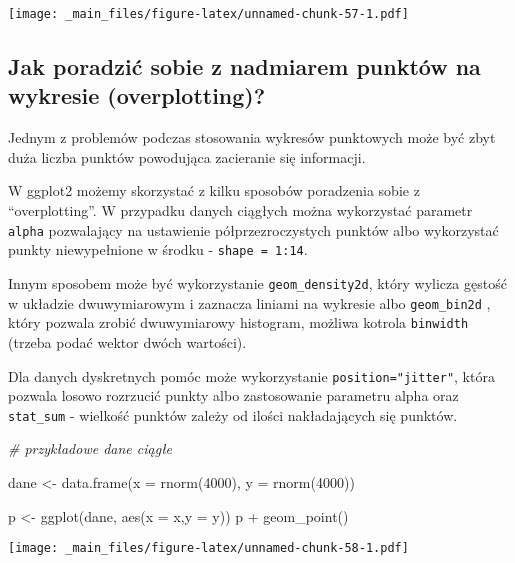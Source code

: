 \documentclass[
]{book}
\newenvironment{Shaded}{\begin{snugshade}}{\end{snugshade}}
\newcommand{\AttributeTok}[1]{\textcolor[rgb]{0.77,0.63,0.00}{#1}}
\newcommand{\CommentTok}[1]{\textcolor[rgb]{0.56,0.35,0.01}{\textit{#1}}}
\newcommand{\DecValTok}[1]{\textcolor[rgb]{0.00,0.00,0.81}{#1}}
\newcommand{\FunctionTok}[1]{\textcolor[rgb]{0.00,0.00,0.00}{#1}}
\newcommand{\NormalTok}[1]{#1}
\newcommand{\OtherTok}[1]{\textcolor[rgb]{0.56,0.35,0.01}{#1}}
\newcommand{\SpecialCharTok}[1]{\textcolor[rgb]{0.00,0.00,0.00}{#1}}
\begin{document}
\texttt{[image: \_main\_files/figure-latex/unnamed-chunk-57-1.pdf]}

\hypertarget{jak-poradziux107-sobie-z-nadmiarem-punktuxf3w-na-wykresie-overplotting}{%
\subsection{Jak poradzić sobie z nadmiarem punktów na wykresie (overplotting)?}\label{jak-poradziux107-sobie-z-nadmiarem-punktuxf3w-na-wykresie-overplotting}}

Jednym z problemów podczas stosowania wykresów punktowych może być zbyt duża liczba punktów powodująca zacieranie się informacji.

W ggplot2 możemy skorzystać z kilku sposobów poradzenia sobie z ``overplotting''. W przypadku danych ciągłych można wykorzystać parametr \texttt{alpha} pozwalający na ustawienie półprzezroczystych punktów albo wykorzystać punkty niewypełnione w środku - \texttt{shape\ =\ 1:14}.

Innym sposobem może być wykorzystanie \texttt{geom\_density2d}, który wylicza gęstość w układzie dwuwymiarowym i zaznacza liniami na wykresie albo \texttt{geom\_bin2d} , który pozwala zrobić dwuwymiarowy histogram, możliwa kotrola \texttt{binwidth} (trzeba podać wektor dwóch wartości).

Dla danych dyskretnych pomóc może wykorzystanie \texttt{position="jitter"}, która pozwala losowo rozrzucić punkty albo zastosowanie parametru alpha oraz \texttt{stat\_sum} - wielkość punktów zależy od ilości nakładających się punktów.

\begin{Shaded}
\begin{Highlighting}[]
\CommentTok{\# przykładowe dane ciągłe}

\NormalTok{dane }\OtherTok{\textless{}{-}} \FunctionTok{data.frame}\NormalTok{(}\AttributeTok{x =} \FunctionTok{rnorm}\NormalTok{(}\DecValTok{4000}\NormalTok{), }\AttributeTok{y =} \FunctionTok{rnorm}\NormalTok{(}\DecValTok{4000}\NormalTok{))}

\NormalTok{p }\OtherTok{\textless{}{-}} \FunctionTok{ggplot}\NormalTok{(dane, }\FunctionTok{aes}\NormalTok{(}\AttributeTok{x =}\NormalTok{ x,}\AttributeTok{y =}\NormalTok{ y))}
\NormalTok{p }\SpecialCharTok{+} \FunctionTok{geom\_point}\NormalTok{()}
\end{Highlighting}
\end{Shaded}

\texttt{[image: \_main\_files/figure-latex/unnamed-chunk-58-1.pdf]}
\end{document}
